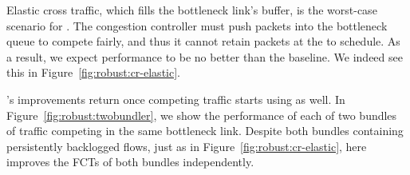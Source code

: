 
 Elastic cross traffic, which fills the bottleneck link's buffer, is the worst-case scenario for \name.
The congestion controller must push packets into the bottleneck queue to compete fairly, and thus it cannot retain packets at the \inbox to schedule.
As a result, we expect performance to be no better than the baseline.
We indeed see this in Figure~\ref{fig:robust:cr-elastic}.



 \name's improvements return once competing traffic starts using \name as well. In Figure~\ref{fig:robust:twobundler}, we show the performance of each of two bundles of traffic competing in the same bottleneck link. 
Despite both bundles containing persistently backlogged flows, just as in Figure~\ref{fig:robust:cr-elastic}, here \name improves the FCTs of both bundles independently.
